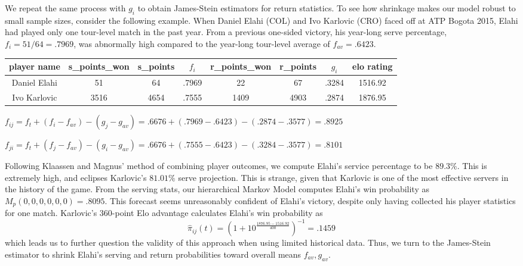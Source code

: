 \documentclass[chapterprefix=false]{report}
\begin{document}
We repeat the same process with $g_i$ to obtain James-Stein estimators for return statistics. To see how shrinkage makes our model robust to small sample sizes, consider the following example. When Daniel Elahi (COL) and Ivo Karlovic (CRO) faced off at ATP Bogota 2015, Elahi had played only one tour-level match in the past year. From a previous one-sided victory, his year-long serve percentage, $f_i=51/64=.7969$, was abnormally high compared to the year-long tour-level average of $f_{av}=.6423$. 


\begin{center}
\begin{tabular}{ |c|c|c|c|c|c|c|c| } 
 \hline
 player name & s\_points\_won & s\_points
 & $f_i$ & r\_points\_won & r\_points & $g_i$ & elo rating \\ 
 \hline
 Daniel Elahi & 51 & 64 & .7969 & 22 & 67 & .3284 & 1516.92 
 \\
 \hline
 Ivo Karlovic & 3516 & 4654 & .7555 & 1409 & 4903 & .2874 & 1876.95 \\ 
 \hline
\end{tabular}
\end{center}

\begin{center}
$f_{ij} = f_t + (f_i-f_{av})-(g_j-g_{av}) = .6676 + (.7969-.6423) - (.2874-.3577) = .8925$

$f_{ji} = f_t + (f_j-f_{av})-(g_i-g_{av}) = .6676 + (.7555-.6423) - (.3284-.3577) = .8101$
\end{center}

Following Klaassen and Magnus' method of combining player outcomes, we compute Elahi's service percentage to be $89.3\%$. This is extremely high, and eclipses Karlovic's $81.01\%$ serve projection. This is strange, given that Karlovic is one of the most effective servers in the history of the game. From the serving stats, our hierarchical Markov Model computes Elahi's win probability as $M_p(0,0,0,0,0,0) = .8095$. This forecast seems unreasonably confident of Elahi's victory, despite only having collected his player statistics for one match. Karlovic's 360-point Elo advantage calculates Elahi's win probability as $$\hat{\pi}_{ij}(t) = (1+10^\frac{1876.95 - 1516.92}{400})^{-1} = .1459$$ which leads us to further question the validity of this approach when using limited historical data. Thus, we turn to the James-Stein estimator to shrink Elahi's serving and return probabilities toward overall means $f_{av},g_{av}$.
\end{document}
